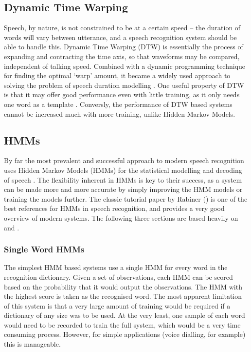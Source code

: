 \subsection{Dynamic Time Warping} %
\label{sub:dynamic_time_warping}
Speech, by nature, is not constrained to be at a certain speed -- the duration of words will vary between utterance, and a speech recognition system should be able to handle this.  Dynamic Time Warping (DTW) is essentially the process of expanding and contracting the time axis, so that waveforms may be compared, independent of talking speed.  Combined with a dynamic programming technique for finding the optimal `warp' amount, it became a widely used approach to solving the problem of speech duration modelling \cite{furui1989speech}.  One useful property of DTW is that it may offer good performance even with little training, as it only needs one word as a template \cite{melnikoff2003speech}.  Conversly, the performance of DTW based systems cannot be increased much with more training, unlike Hidden Markov Models.

\subsection{HMMs} %
\label{sub:about_hmms}
By far the most prevalent and successful approach to modern speech recognition uses Hidden Markov Models (HMMs) for the statistical modelling and decoding of speech \cite{cox1988hidden}.  The flexibility inherent in HMMs is key to their success, as a system can be made more and more accurate by simply improving the HMM models or training the models further.  The classic tutorial paper by Rabiner (\cite{rabiner1989tutorial}) is one of the best references for HMMs in speech recognition, and provides a very good overview of modern systems.  The following three sections are based heavily on \cite{rabiner1989tutorial} and \cite{htkbook}.

\subsubsection{Single Word HMMs} %
\label{ssub:single_word_hmms}
The simplest HMM based systems use a single HMM for every word in the recognition dictionary.  Given a set of observations, each HMM can be scored based on the probability that it would output the observations.  The HMM with the highest score is taken as the recognised word.  The most apparent limitation of this system is that a very large amount of training would be required if a dictionary of any size was to be used.  At the very least, one sample of each word would need to be recorded to train the full system, which would be a very time consuming process.  However, for simple applications (voice dialling, for example) this is manageable.

